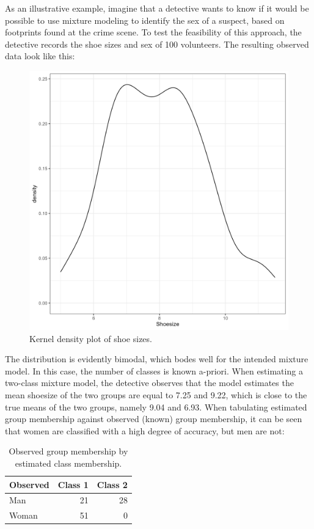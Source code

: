 \documentclass[
  ,man]{apa6}
\begin{document}
As an illustrative example, imagine that a detective wants to know if it would be
possible to use mixture modeling to identify the sex of a suspect,
based on footprints found at the crime scene.
To test the feasibility of this approach,
the detective records the shoe sizes and sex of 100 volunteers.
The resulting observed data look like this:

\begin{figure}
\includegraphics[width=7in]{shoedens} \caption{Kernel density plot of shoe sizes.}\label{fig:shoedens}
\end{figure}

The distribution is evidently bimodal, which bodes well for the intended mixture model.
In this case, the number of classes is known a-priori.
When estimating a two-class mixture model, the detective observes that the model estimates
the mean shoesize of the two groups are equal to 7.25 and 9.22,
which is close to the true means of the two groups, namely 9.04 and 6.93.
When tabulating estimated group membership against observed (known) group membership, it can be seen that women are classified with a high degree of accuracy, but men are not:

\begin{table}

\caption{\label{tab:tabshoe}Observed group membership by estimated class membership.}
\centering
\begin{tabular}[t]{l|r|r}
\hline
Observed & Class 1 & Class 2\\
\hline
Man & 21 & 28\\
\hline
Woman & 51 & 0\\
\hline
\end{tabular}
\end{table}
\end{document}
